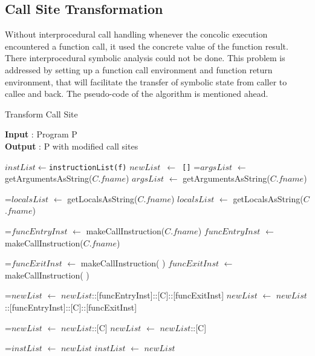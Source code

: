 \documentclass[12pt,oneside]{book}
\newcommand*{\thealgruleheight}{.75\baselineskip}
\newcommand*{\thealgruledepth}{.25\baselineskip}
\newcommand{\myState}[1]{%
    \setbox\statebox=\vbox{#1}%
    \edef\thealgruleheight{\dimexpr \the\ht\statebox+1pt\relax}%
    \edef\thealgruledepth{\dimexpr \the\dp\statebox+1pt\relax}%
    \ifdim\thealgruleheight<.75\baselineskip
        \def\thealgruleheight{\dimexpr .75\baselineskip+1pt\relax}%
    \fi
    \ifdim\thealgruledepth<.25\baselineskip
        \def\thealgruledepth{\dimexpr .25\baselineskip+1pt\relax}%
    \fi
    \State #1%
    \def\thealgruleheight{\dimexpr .75\baselineskip+1pt\relax}%
    \def\thealgruledepth{\dimexpr .25\baselineskip+1pt\relax}%
}
\begin{document}

\subsection{Call Site Transformation}
Without interprocedural call handling whenever the concolic execution encountered a function call, it used the concrete value of the function result. There interprocedural symbolic analysis could not be done. This problem is addressed by setting up a function call environment and function return environment, that will facilitate the transfer of symbolic state from caller to callee and back. The pseudo-code of the algorithm is mentioned ahead.\\


\begin{algorithm}[H]
  \caption{Transform Call Site}\label{transform call site}
  \small
  \vspace{4mm}
  {\textbf{Input} : Program P}\\
  {\textbf{Output} : P with modified call sites}
  \begin{algorithmic}[1]
      \vspace{0.8mm}
        \vspace{0.8mm}
        \State \texttt{$instList \gets $instructionList(f)}
        \State \texttt{$newList$ $\leftarrow$ []}
        \vspace{0.8mm}
          \vspace{0.8mm}
            \myState {$argsList$ $\gets$ getArgumentsAsString($C$.$fname$)}
            \myState {$localsList$ $\gets$ getLocalsAsString($C$.$fname$)}
			\myState {$funcEntryInst$ $\gets$ makeCallInstruction($C$.$fname$)}
			\myState {$funcExitInst$ $\gets$ makeCallInstruction( )}
			\myState {$newList$ $\gets$ $newList$::[funcEntryInst]::[C]::[funcExitInst]}
          \Else
            \myState {$newList$ $\gets$ $newList$::[C]}
          \EndIf
        \myState {$instList$ $\gets$ $newList$}  
        \EndFor
      \EndFor
    \EndProcedure
  \end{algorithmic}
\end{algorithm}
\end{document}
